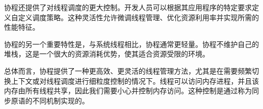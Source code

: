 协程还提供了对线程调度的更大控制。开发人员可以根据其应用程序的特定要求定义自定义调度策略。这种灵活性允许微调线程管理、优化资源利用率并实现所需的性能特征。

协程的另一个重要特性是，与系统线程相比，协程通常更轻量。协程不维护自己的堆栈，这是一个很大的资源消耗优势，使其适合资源受限的环境。

总体而言，协程提供了一种更高效、更灵活的线程管理方法，尤其是在需要频繁切换上下文或对线程调度进行细粒度控制的情况下。线程可以访问内存进程，并且该内存由所有线程共享，因此我们需要小心并控制内存访问。这种控制是通过称为同步原语的不同机制实现的。


































